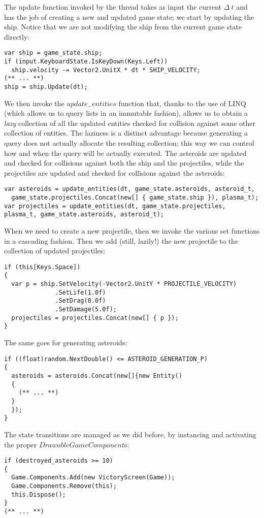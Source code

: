 The update function invoked by the thread takes as input the current $\Delta\ t$ and has the job of creating a new and updated game state; we start by updating the ship. Notice that we are not modifying the ship from the current game state directly:
\begin{lstlisting}
var ship = game_state.ship;
if (input.KeyboardState.IsKeyDown(Keys.Left))
  ship.velocity -= Vector2.UnitX * dt * SHIP_VELOCITY;
(** ... **)
ship = ship.Update(dt);
\end{lstlisting}

We then invoke the $update_{-}entities$ function that, thanks to the use of LINQ (which allows us to query lists in an immutable fashion), allows us to obtain a \textit{lazy} collection of all the updated entities checked for collision against some other collection of entities. The laziness is a distinct advantage because generating a query does not actually allocate the resulting collection; this way we can control how and when the query will be actually executed. The asteroids are updated and checked for collisions against both the ship and the projectiles, while the projectiles are updated and checked for collisions against the asteroids:
\begin{lstlisting}
var asteroids = update_entities(dt, game_state.asteroids, asteroid_t,
  game_state.projectiles.Concat(new[] { game_state.ship }), plasma_t);
var projectiles = update_entities(dt, game_state.projectiles, plasma_t, game_state.asteroids, asteroid_t);
\end{lstlisting}

When we need to create a new projectile, then we invoke the various set functions in a cascading fashion. Then we add (still, lazily!) the new projectile to the collection of updated projectiles:
\begin{lstlisting}
if (this[Keys.Space])
{
  var p = ship.SetVelocity(-Vector2.UnitY * PROJECTILE_VELOCITY)
              .SetLife(1.0f)
              .SetDrag(0.0f)
              .SetDamage(5.0f);
  projectiles = projectiles.Concat(new[] { p });
}
\end{lstlisting}

The same goes for generating asteroids:
\begin{lstlisting}
if ((float)random.NextDouble() <= ASTEROID_GENERATION_P)
{
  asteroids = asteroids.Concat(new[]{new Entity()
  {
    (** ... **)
  }
  });
}
\end{lstlisting}

The state transitions are managed as we did before, by instancing and activating the proper $DrawableGameComponent$s:
\begin{lstlisting}
if (destroyed_asteroids >= 10)
{
  Game.Components.Add(new VictoryScreen(Game));
  Game.Components.Remove(this);
  this.Dispose();
}
(** ... **)
\end{lstlisting}


